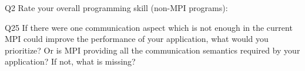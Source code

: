 \begin{description}%
\item{Q2} Rate your overall programming skill (non-MPI programs):%
\item{Q25} If there were one communication aspect which is not enough in the current MPI could improve the performance of your application, what would you prioritize? Or is MPI providing all the communication semantics required by your application? If not, what is missing?%
\end{description}%
